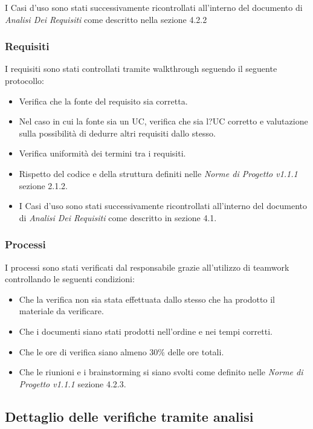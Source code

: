 \documentclass[a4paper]{article}
\begin{document}
				I Casi d'uso sono stati successivamente ricontrollati all'interno del documento di \emph{Analisi Dei Requisiti} come
				descritto nella sezione 4.2.2
			\subsubsection{Requisiti}
				I requisiti sono stati controllati tramite walkthrough seguendo il seguente protocollo:
					\begin{itemize}
						\item Verifica che la fonte del requisito sia corretta.
						\item Nel caso in cui la fonte sia un UC, verifica che sia l?UC corretto e valutazione
	 sulla possibilità di dedurre altri requisiti dallo stesso.
						\item Verifica uniformità dei termini tra i requisiti.
						\item Rispetto del codice e della struttura definiti nelle \emph{Norme di Progetto v1.1.1} sezione 2.1.2.
						\item I Casi d'uso sono stati successivamente ricontrollati all'interno del documento di \emph{Analisi Dei Requisiti} 
						come descritto in sezione 4.1.
					\end{itemize}
			\subsubsection{Processi}
				I processi sono stati verificati dal responsabile grazie all'utilizzo di teamwork controllando le seguenti condizioni:
				\begin{itemize}
					\item Che la verifica non sia stata effettuata dallo stesso che ha prodotto il materiale da verificare.
					\item Che i documenti siano stati prodotti nell'ordine e nei tempi corretti.
					\item Che le ore di verifica siano almeno 30\% delle ore totali.
					\item Che le riunioni e i brainstorming si siano svolti come definito nelle \emph{Norme di Progetto v1.1.1} sezione 4.2.3.
				\end{itemize}
				
		
		\subsection{Dettaglio delle verifiche tramite analisi}
\end{document}

